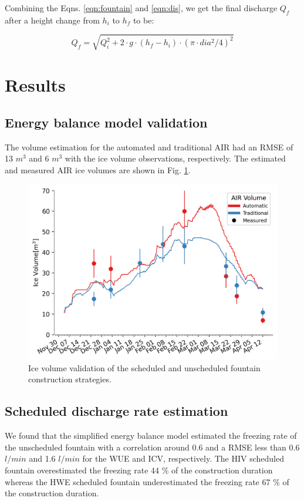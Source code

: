 \documentclass[tc, manuscript]{copernicus}
\begin{document}
Combining the Eqns. \ref{eqn:fountain} and \ref{eqn:dis}, we get the final discharge $Q_f$ after a height change from $h_i$ to $h_f$ to be:

\begin{equation}
  \label{eqn:discharge}
  Q_f = \sqrt{Q_i^2 + 2 \cdot g \cdot (h_f-h_i) \cdot (\pi \cdot dia^2/4)^2}
\end{equation}


\section{Results}

\subsection{Energy balance model validation}

The volume estimation for the automated and traditional AIR had an RMSE of 13 $m^3$ and 6 $m^3$ with the ice
volume observations, respectively. The estimated and measured AIR ice volumes are shown in Fig.
\ref{fig:validation}.
 
\begin{figure}[t] \includegraphics[width=12cm]
  {Figures/validation.png} 
  \caption{Ice volume validation of the scheduled and unscheduled fountain construction strategies.} 
\label{fig:validation} 
\end{figure}

\subsection{Scheduled discharge rate estimation}

We found that the simplified energy balance model estimated the freezing rate of the unscheduled fountain with a
correlation around 0.6 and a RMSE less than 0.6 $l/min$ and 1.6  $l/min$ for the WUE and ICV,
respectively. The HIV scheduled fountain overestimated the freezing rate 44 \% of the construction duration
whereas the HWE scheduled fountain underestimated the freezing rate 67 \% of the construction duration.
\end{document}
